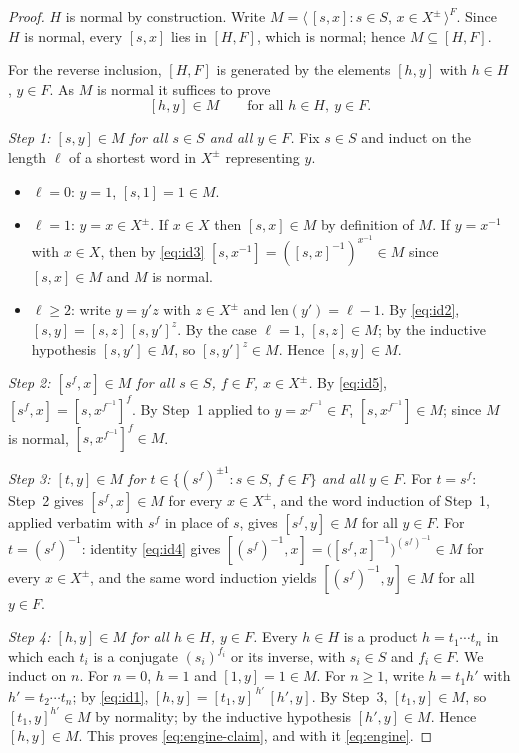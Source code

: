 \documentclass{amsart}
\theoremstyle{definition}
\theoremstyle{remark}
\begin{document}
\begin{proof}
$H$ is normal by construction. Write
$M=\langle\,[s,x]:s\in S,\,x\in X^{\pm}\,\rangle^{F}$. Since $H$ is normal, every
$[s,x]$ lies in $[H,F]$, which is normal; hence $M\subseteq[H,F]$.

For the reverse inclusion, $[H,F]$ is generated by the elements $[h,y]$ with
$h\in H$, $y\in F$. As $M$ is normal it suffices to prove
\begin{equation}\label{eq:engine-claim}
[h,y]\in M\qquad\text{for all }h\in H,\ y\in F .
\end{equation}

\smallskip
\emph{Step 1: $[s,y]\in M$ for all $s\in S$ and all $y\in F$.}
Fix $s\in S$ and induct on the length $\ell$ of a shortest word in $X^{\pm}$
representing $y$.
\begin{itemize}
\item $\ell=0$: $y=1$, $[s,1]=1\in M$.
\item $\ell=1$: $y=x\in X^{\pm}$. If $x\in X$ then $[s,x]\in M$ by definition of
$M$. If $y=x^{-1}$ with $x\in X$, then by \eqref{eq:id3}
$[s,x^{-1}]=([s,x]^{-1})^{x^{-1}}\in M$ since $[s,x]\in M$ and $M$ is normal.
\item $\ell\ge2$: write $y=y'z$ with $z\in X^{\pm}$ and $\mathrm{len}(y')=\ell-1$.
By \eqref{eq:id2}, $[s,y]=[s,z]\,[s,y']^{z}$. By the case $\ell=1$, $[s,z]\in M$;
by the inductive hypothesis $[s,y']\in M$, so $[s,y']^{z}\in M$. Hence
$[s,y]\in M$.
\end{itemize}

\smallskip
\emph{Step 2: $[s^{f},x]\in M$ for all $s\in S$, $f\in F$, $x\in X^{\pm}$.}
By \eqref{eq:id5}, $[s^{f},x]=[s,x^{f^{-1}}]^{f}$. By Step~1 applied to
$y=x^{f^{-1}}\in F$, $[s,x^{f^{-1}}]\in M$; since $M$ is normal,
$[s,x^{f^{-1}}]^{f}\in M$.

\smallskip
\emph{Step 3: $[t,y]\in M$ for $t\in\{(s^{f})^{\pm1}:s\in S,\,f\in F\}$ and all
$y\in F$.}
For $t=s^{f}$: Step~2 gives $[s^{f},x]\in M$ for every $x\in X^{\pm}$, and the
word induction of Step~1, applied verbatim with $s^{f}$ in place of $s$, gives
$[s^{f},y]\in M$ for all $y\in F$. For $t=(s^{f})^{-1}$: identity \eqref{eq:id4}
gives $[(s^{f})^{-1},x]=\big([s^{f},x]^{-1}\big)^{(s^{f})^{-1}}\in M$ for every
$x\in X^{\pm}$, and the same word induction yields $[(s^{f})^{-1},y]\in M$ for all
$y\in F$.

\smallskip
\emph{Step 4: $[h,y]\in M$ for all $h\in H$, $y\in F$.}
Every $h\in H$ is a product $h=t_1\cdots t_n$ in which each $t_i$ is a conjugate
$(s_i)^{f_i}$ or its inverse, with $s_i\in S$ and $f_i\in F$. We induct on $n$.
For $n=0$, $h=1$ and $[1,y]=1\in M$. For $n\ge1$, write $h=t_1 h'$ with
$h'=t_2\cdots t_n$; by \eqref{eq:id1},
$[h,y]=[t_1,y]^{\,h'}\,[h',y]$. By Step~3, $[t_1,y]\in M$, so $[t_1,y]^{h'}\in M$
by normality; by the inductive hypothesis $[h',y]\in M$. Hence $[h,y]\in M$. This
proves \eqref{eq:engine-claim}, and with it \eqref{eq:engine}.
\end{proof}
\end{document}
